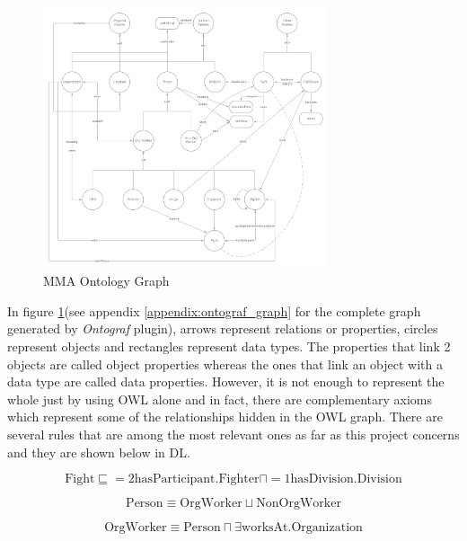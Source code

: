 \documentclass[a4paper]{article}
\begin{document}
\begin{figure}[H]
	\centering
	\includegraphics[width=0.75\textwidth]{resources/mma_onto.png}
	\caption{MMA Ontology Graph}
	\label{fig:mma_ontology}
\end{figure}

In figure \ref{fig:mma_ontology}(see appendix \ref{appendix:ontograf_graph} for the complete graph generated by \textit{Ontograf} plugin), arrows represent relations or properties, 
circles represent objects and rectangles represent data types. The properties that link 2 objects are called object properties whereas the ones that link an object with a data type 
are called data properties. However, it is not enough to represent the whole just by using OWL alone and in fact, there are complementary axioms which represent some of the relationships 
hidden in the OWL graph. There are several rules that are among the most relevant ones as far as this project concerns and they are shown below in DL.

\begin{equation}
	\text{Fight} \sqsubseteq =2\text{hasParticipant}.\text{Fighter} \sqcap =1\text{hasDivision}.\text{Division}
	\label{formula:axiom_fight}
\end{equation}

\begin{equation}
	\text{Person} \equiv \text{OrgWorker} \sqcup \text{NonOrgWorker}
	\label{formula:axiom_person}
\end{equation}

\begin{equation}
	\text{OrgWorker} \equiv \text{Person} \sqcap \exists \text{worksAt}.\text{Organization}
	\label{formula:axiom_orgworker}
\end{equation}
\end{document}
